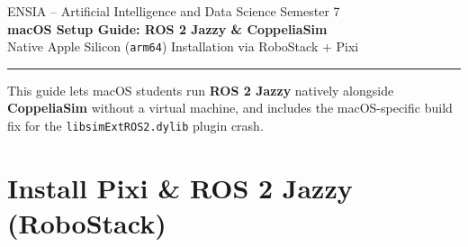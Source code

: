 \documentclass[11pt,a4paper]{article}
\begin{document}
\begin{center}
  {\small ENSIA -- Artificial Intelligence and Data Science \quad \textbullet \quad Semester 7}\\[0.2cm]
  {\LARGE \textbf{\color{primary}macOS Setup Guide: ROS 2 Jazzy \& CoppeliaSim}}\\[0.15cm]
  {\normalsize Native Apple Silicon (\texttt{arm64}) Installation via RoboStack + Pixi}\\[0.25cm]
  \rule{\linewidth}{0.8pt}
\end{center}
\vspace{-0.1cm}

This guide lets macOS students run \textbf{ROS 2 Jazzy} natively alongside \textbf{CoppeliaSim} without a virtual machine, and includes the macOS-specific build fix for the \texttt{libsimExtROS2.dylib} plugin crash.

\section{Install Pixi \& ROS 2 Jazzy (RoboStack)}
\end{document}
